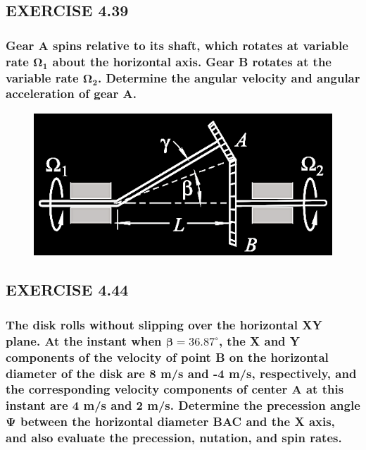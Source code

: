 \documentclass[12pt, letterpaper]{../assignment}
\begin{document}
\subsection*{EXERCISE 4.39}
\subsubsection*{Gear A spins relative to its shaft,
which rotates at variable rate $\bm{\Omega_1}$ about the horizontal axis.
Gear B rotates at the variable rate $\bm{\Omega_2}$.
Determine the angular velocity and angular acceleration of gear A.}

\begin{figure}[H]
    \centering
    \includegraphics[frame]{images/Q4_39.png}
\end{figure}


\subsection*{EXERCISE 4.44}
\subsubsection*{The disk rolls without slipping over the horizontal XY plane.
At the instant when $\bm{\beta = 36.87^\circ}$,
the X and Y components of the velocity of point B on the horizontal diameter of the disk are 8 m/s and -4 m/s,
respectively, and the corresponding velocity components of center A at this instant are 4 m/s and 2 m/s.
Determine the precession angle $\bm{\Psi}$ between the horizontal diameter BAC and the X axis,
and also evaluate the precession, nutation, and spin rates.}
\end{document}
